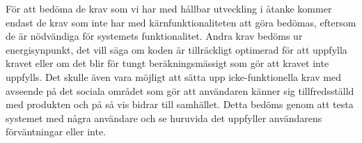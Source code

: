 För att bedöma de krav som vi har med hållbar utveckling i åtanke kommer endast de krav som inte har med kärnfunktionaliteten att göra bedömas, eftersom de är nödvändiga för systemets funktionalitet. Andra krav bedöms ur energisynpunkt, det vill säga om koden är tillräckligt optimerad för att uppfylla kravet eller om det blir för tungt beräkningsmässigt som gör att kravet inte uppfylls. Det skulle även vara möjligt att sätta upp icke-funktionella krav med avseende på det sociala området som gör att användaren känner sig tillfredsställd med produkten och på så vis bidrar till samhället. Detta bedöms genom att testa systemet med några användare och se huruvida det uppfyller användarens förväntningar eller inte. 

